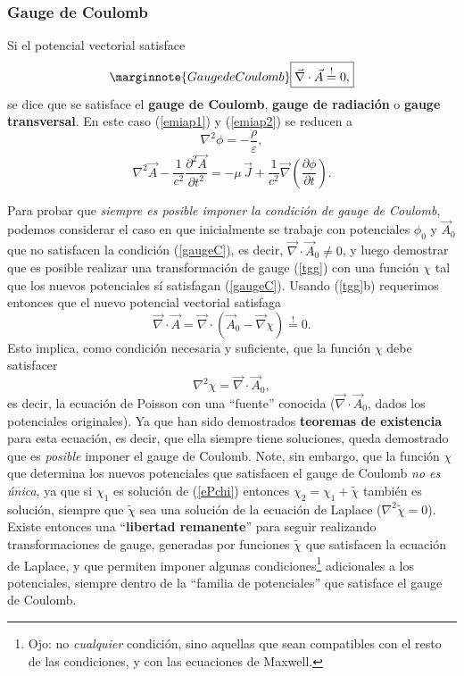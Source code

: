 \subsubsection{Gauge de Coulomb}
Si el potencial vectorial satisface
\begin{equation}\marginnote{Gauge de Coulomb}\label{gaugeC}
\boxed{ \vec{\nabla}\cdot\vec{A}\stackrel{!}{=}0,}
\end{equation}
se dice que se satisface el \textbf{gauge de Coulomb}, \textbf{gauge de radiación} o \textbf{gauge transversal}. En este caso (\ref{emiap1}) y (\ref{emiap2}) se reducen a
\begin{equation}\label{emiap1GC}
 \nabla^2\phi=-\frac{\rho}{\varepsilon},
\end{equation}
\begin{equation}\label{emiap2GC}
 \nabla^2\vec{A}-\frac{1}{c^2}\frac{\partial^2\vec{A}}{\partial t^2}=-\mu\,\vec{J}+\frac{1}{c^2}\vec{\nabla}\left(\frac{\partial\phi }{\partial t}\right).
\end{equation}

Para probar que \textit{siempre es posible imponer la condición de gauge de Coulomb}, podemos considerar el caso en que inicialmente se trabaje con potenciales $\phi_0$ y $\vec{A}_0$ que no satisfacen la condición (\ref{gaugeC}), es decir, $\vec\nabla\cdot\vec{A}_0\neq 0$, y luego demostrar que es posible realizar una transformación de gauge (\ref{tgg}) con una función $\chi$ tal que los nuevos potenciales sí satisfagan (\ref{gaugeC}). Usando (\ref{tgg}b) requerimos entonces que el nuevo potencial vectorial satisfaga
\begin{equation}
\vec\nabla\cdot\vec{A}=\vec\nabla\cdot(\vec{A}_0-\vec\nabla\chi)\stackrel{!}{=}0.
\end{equation}
Esto implica, como condición necesaria y suficiente, que la función $\chi$ debe satisfacer 
\begin{equation}\label{ePchi}
\nabla^2\chi=\vec\nabla\cdot\vec{A}_0,
\end{equation}
es decir, la ecuación de Poisson con una ``fuente'' conocida ($\vec\nabla\cdot\vec{A}_0$, dados los potenciales originales). Ya que han sido demostrados \textbf{teoremas de existencia} para esta ecuación, es decir, que ella siempre tiene soluciones, queda demostrado que es \textit{posible} imponer el gauge de Coulomb. Note, sin embargo, que la función $\chi$ que determina los nuevos potenciales que satisfacen el gauge de Coulomb \textit{no es única}, ya que si $\chi_1$ es solución de (\ref{ePchi}) entonces $\chi_2=\chi_1+\tilde\chi$ también es solución, siempre que $\tilde\chi$ sea una solución de la ecuación de Laplace ($\nabla^2\tilde\chi=0$). Existe entonces una ``\textbf{libertad remanente}'' para seguir realizando transformaciones de gauge, generadas por funciones $\tilde\chi$ que satisfacen la ecuación de Laplace, y que permiten imponer algunas condiciones\footnote{Ojo: no \textit{cualquier} condición, sino aquellas que sean compatibles con el resto de las condiciones, y con las ecuaciones de Maxwell.} adicionales a los potenciales, siempre dentro de la ``familia de potenciales'' que satisface el gauge de Coulomb.

